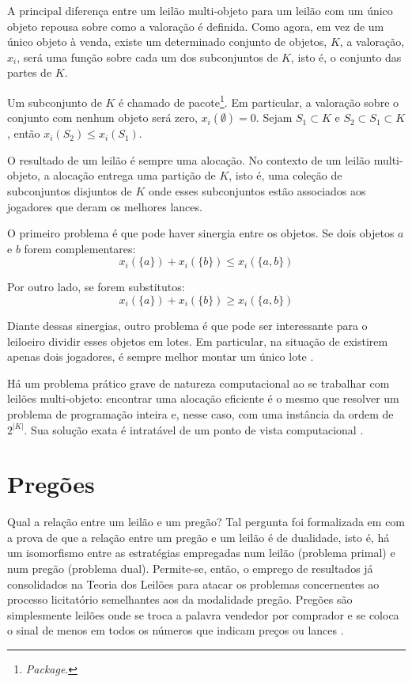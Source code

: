 A principal diferença entre um leilão multi-objeto para um leilão com um único objeto repousa sobre como a valoração é definida. Como agora, em vez de um único objeto à venda, existe um determinado conjunto de objetos, $K$, a valoração, $x_i$, será uma função sobre cada um dos subconjuntos de $K$, isto é, o conjunto das partes de $K$.

Um subconjunto de $K$ é chamado de pacote\footnote{\emph{Package}.}. Em particular, a valoração sobre o conjunto com nenhum objeto será zero, $x_i(\emptyset) = 0$. Sejam $S_1 \subset K$ e $S_2 \subset S_1 \subset K$, então $x_i(S_2) \leq x_i(S_1)$.

O resultado de um leilão é sempre uma alocação. No contexto de um leilão multi-objeto, a alocação entrega uma partição de $K$, isto é, uma coleção de subconjuntos disjuntos de $K$ onde esses subconjuntos estão associados aos jogadores que deram os melhores lances.

O primeiro problema é que pode haver sinergia entre os objetos. Se dois objetos $a$ e $b$ forem complementares:
\begin{equation*}
	x_i(\{a\}) + x_i(\{b\}) \leq x_i(\{a,b\})
\end{equation*}

Por outro lado, se forem substitutos:
\begin{equation*}
	x_i(\{a\}) + x_i(\{b\}) \geq x_i(\{a,b\})
\end{equation*}

Diante dessas sinergias, outro problema é que pode ser interessante para o leiloeiro dividir esses objetos em lotes. Em particular, na situação de existirem apenas dois jogadores, é sempre melhor montar um único lote \citet{krishna}.

Há um problema prático grave de natureza computacional ao se trabalhar com leilões multi-objeto: encontrar uma alocação eficiente é o mesmo que resolver um problema de programação inteira e, nesse caso, com uma instância da ordem de $2^|K|$. Sua solução exata é intratável de um ponto de vista computacional \citet{Nisan2007}.

\section{Pregões}

Qual a relação entre um leilão e um pregão? Tal pergunta foi formalizada em \citet{deCastro2010} com a prova de que a relação entre um pregão e um leilão é de dualidade, isto é, há um isomorfismo entre as estratégias empregadas num leilão (problema primal) e num pregão (problema dual). Permite-se, então, o emprego de resultados já consolidados na Teoria dos Leilões para atacar os problemas concernentes ao processo licitatório semelhantes aos da modalidade pregão. Pregões são simplesmente leilões onde se troca a palavra vendedor por comprador e se coloca o sinal de menos em todos os números que indicam preços ou lances \citet{Shoham2008}.

